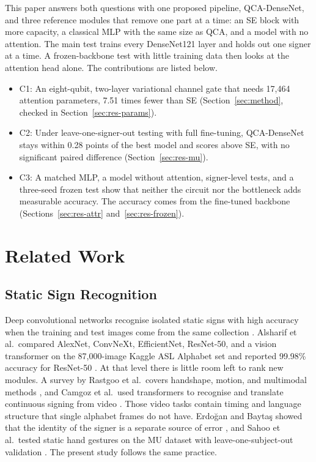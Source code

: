\documentclass[10pt,twocolumn]{article}
\newcommand{\QCA}{QCA}
\begin{document}
This paper answers both questions with one proposed pipeline, QCA-DenseNet,
and three reference modules that remove one part at a time: an SE block with
more capacity, a classical MLP with the same size as \QCA{}, and a model
with no attention. The main test trains every DenseNet121 layer and holds
out one signer at a time. A frozen-backbone test with little training data
then looks at the attention head alone. The contributions are listed below.
\vspace{0pt plus 1fil}
\begin{itemize}[itemsep=8pt plus 1fil, topsep=4pt, parsep=0pt, partopsep=0pt]
  \item C1: An eight-qubit, two-layer variational channel gate that needs
  17,464 attention parameters, 7.51 times fewer than SE
  (Section~\ref{sec:method}, checked in Section~\ref{sec:res-params}).
  \item C2: Under leave-one-signer-out testing with full fine-tuning,
  QCA-DenseNet stays within 0.28 points of the best model and scores above
  SE, with no significant paired difference (Section~\ref{sec:res-mu}).
  \item C3: A matched MLP, a model without attention, signer-level tests,
  and a three-seed frozen test show that neither the circuit nor the
  bottleneck adds measurable accuracy. The accuracy comes from the
  fine-tuned backbone (Sections~\ref{sec:res-attr} and~\ref{sec:res-frozen}).
\end{itemize}

\section{Related Work}
\label{sec:related}

\subsection{Static Sign Recognition}

Deep convolutional networks recognise isolated static signs with high
accuracy when the training and test images come from the same collection
\citep{wadhawan_2020_static}. Alsharif et al.\ compared AlexNet, ConvNeXt,
EfficientNet, ResNet-50, and a vision transformer on the 87,000-image Kaggle
ASL Alphabet set and reported 99.98\% accuracy for ResNet-50
\citep{alsharif_2023_asl}. At that level there is little room left to rank
new modules. A survey by Rastgoo et al.\ covers handshape, motion, and
multimodal methods \citep{rastgoo_2021_survey}, and Camgoz et al.\ used
transformers to recognise and translate continuous signing from video
\citep{camgoz_2020_slt}. Those video tasks contain timing and language
structure that single alphabet frames do not have. Erdo\u{g}an and
Bayta\c{s} showed that the identity of the signer is a separate source of
error \citep{erdogan_2024_signer}, and Sahoo et al.\ tested static hand
gestures on the MU dataset with leave-one-subject-out validation
\citep{sahoo_2022_mu}. The present study follows the same practice.
\end{document}
